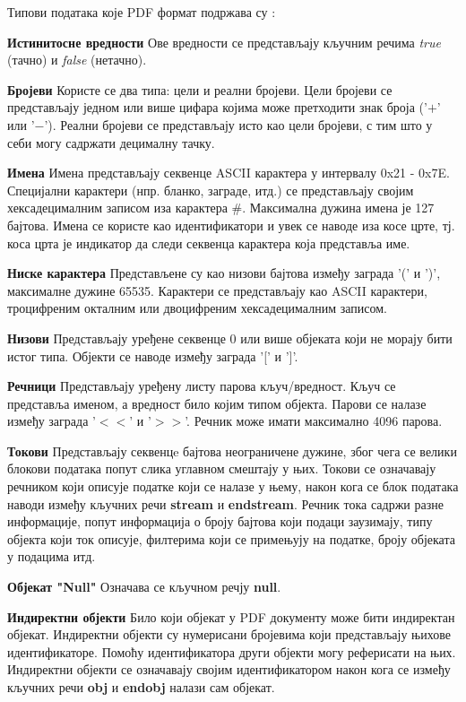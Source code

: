 \documentclass[12pt,oneside]{memoir}
\begin{document}
Типови података које PDF формат подржава су \cite{PDFDoc}:
\begin{description}
\item \textbf{Истинитосне вредности} Ове вредности се представљају кључним речима \textit{true} (тачно) и \textit{false} (нетачно).
\item \textbf{Бројеви} Користе се два типа: цели и реални бројеви. Цели бројеви се представљају једном или више цифара којима може претходити знак броја ('$+$' или '$-$'). Реални бројеви се представљају исто као цели бројеви, с тим што у себи могу садржати децималну тачку.
\item \textbf{Имена} Имена представљају секвенце ASCII карактера у интервалу 0x21 - 0x7E. Специјални карактери (нпр. бланко, заграде, итд.) се представљају својим хексадецималним записом иза карактера $\#$. Максимална дужина имена је 127 бајтова. Имена се користе као идентификатори и увек се наводе иза косе црте, тј. коса црта је индикатор да следи секвенца карактера која представља име.
\item \textbf{Ниске карактера} Представљене су као низови бајтова између заграда '(' и ')', максималне дужине 65535. Карактери се представљају као ASCII карактери, троцифреним окталним или двоцифреним хексадецималним записом. 
\item \textbf{Низови} Представљају уређене секвенце 0 или више објеката који не морају бити истог типа. Објекти се наводе између заграда '[' и ']'.
\item \textbf{Речници} Представљају уређену листу парова кључ/вредност. Кључ се представља именом, а вредност било којим типом објекта. Парови се налазе између заграда '$<<$' и '$>>$'. Речник може имати максимално 4096 парова. 
\item \textbf{Токови} Представљају секвенцe бајтова неограничене дужине, због чега се велики блокови података попут слика углавном смештају у њих. Токови се означавају речником који описује податке који се налазе у њему, након кога се блок података наводи између кључних речи \textbf{stream} и \textbf{endstream}. Речник тока садржи разне информације, попут информација о броју бајтова који подаци заузимају, типу објекта који ток описује, филтерима који се примењују на податке, броју објеката у подацима итд.
\item \textbf{Објекат "Null"} Означава се кључном речју \textbf{null}.
\item \textbf{Индиректни објекти} Било који објекат у PDF документу може бити индиректан објекат. Индиректни објекти су нумерисани бројевима који представљају њихове идентификаторе. Помоћу идентификатора други објекти могу реферисати на њих. Индиректни објекти се означавају својим идентификатором након кога се између кључних речи \textbf{obj} и \textbf{endobj} налази сам објекат. 
\end{description} 
\end{document}

